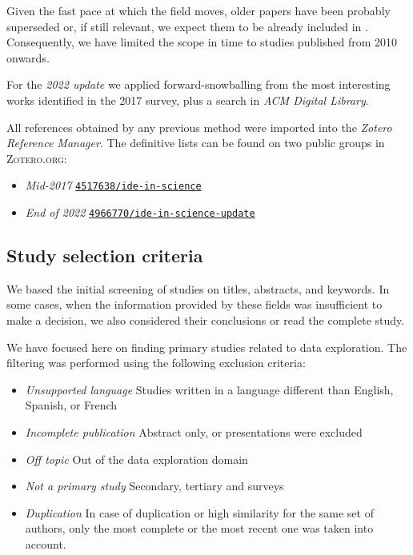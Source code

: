 Given the fast pace at which the field moves, older papers have been probably
superseded or, if still relevant, we expect them to be already included in \cite{Idreos2015}.
Consequently, we have limited the scope in time to studies published from 2010 onwards.


For the \emph{2022 update} we applied forward-snowballing from the most interesting works
identified in the 2017 survey, plus a search in \emph{ACM Digital Library}.


All references obtained by any previous method were imported into
the \emph{Zotero Reference Manager}. The definitive lists can be found on two public groups in
\textsc{Zotero.org}:

\begin{itemize}
    \item \emph{Mid-2017} \href{https://www.zotero.org/groups/4517638/ide-in-science/library}{\texttt{4517638/ide-in-science}}
    \item \emph{End of 2022} \href{https://www.zotero.org/groups/4966770/ide-in-science-update/library}{\texttt{4966770/ide-in-science-update}}
\end{itemize}

\subsection{Study selection criteria}
We based the initial screening of studies on titles, abstracts, and keywords.
In some cases, when the information provided by these fields was
insufficient to make a decision, we also considered their conclusions
or read the complete study.

We have focused here on finding primary studies related to data exploration.
The filtering was performed using the following exclusion criteria:

\begin{itemize}
  \item \emph{Unsupported language} Studies written in a language different than
  English, Spanish, or French
  \item \emph{Incomplete publication} Abstract only, or presentations were excluded
  \item \emph{Off topic} Out of the data exploration domain
  \item \emph{Not a primary study} Secondary, tertiary and surveys
  \item \emph{Duplication} In case of duplication or high similarity for the same
  set of authors, only the most complete or the most recent one was
  taken into account.
\end{itemize}

